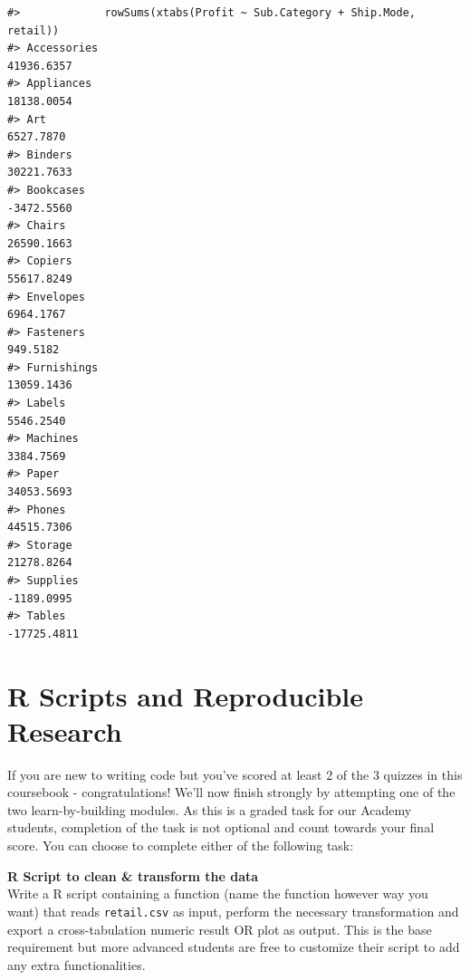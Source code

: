 \documentclass[]{article}
\begin{document}
\begin{verbatim}
#>             rowSums(xtabs(Profit ~ Sub.Category + Ship.Mode, retail))
#> Accessories                                                41936.6357
#> Appliances                                                 18138.0054
#> Art                                                         6527.7870
#> Binders                                                    30221.7633
#> Bookcases                                                  -3472.5560
#> Chairs                                                     26590.1663
#> Copiers                                                    55617.8249
#> Envelopes                                                   6964.1767
#> Fasteners                                                    949.5182
#> Furnishings                                                13059.1436
#> Labels                                                      5546.2540
#> Machines                                                    3384.7569
#> Paper                                                      34053.5693
#> Phones                                                     44515.7306
#> Storage                                                    21278.8264
#> Supplies                                                   -1189.0995
#> Tables                                                    -17725.4811
\end{verbatim}

\hypertarget{r-scripts-and-reproducible-research}{%
\section{R Scripts and Reproducible
Research}\label{r-scripts-and-reproducible-research}}

If you are new to writing code but you've scored at least 2 of the 3
quizzes in this coursebook - congratulations! We'll now finish strongly
by attempting one of the two learn-by-building modules. As this is a
graded task for our Academy students, completion of the task is not
optional and count towards your final score. You can choose to complete
either of the following task:

\textbf{R Script to clean \& transform the data}\\
Write a R script containing a function (name the function however way
you want) that reads \texttt{retail.csv} as input, perform the necessary
transformation and export a cross-tabulation numeric result OR plot as
output. This is the base requirement but more advanced students are free
to customize their script to add any extra functionalities.
\end{document}

